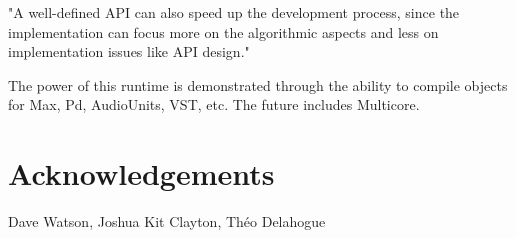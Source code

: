\documentclass[twoside,10pt]{article}
\begin{document}
"A well-defined API can also speed up the development process, since the implementation can focus more on the algorithmic aspects and less on implementation issues like API design." \cite{Lerch:2005}

The power of this runtime is demonstrated through the ability to compile objects for Max, Pd, AudioUnits, VST, etc.  The future includes Multicore.






\section{Acknowledgements} %

Dave Watson, Joshua Kit Clayton, Théo Delahogue




\end{document}
